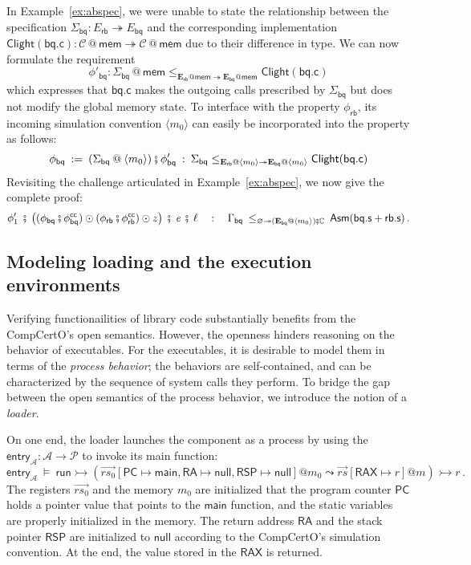 \documentclass[acmsmall,screen,review,anonymous,nonacm]{acmart}
\newcommand{\kw}[1]{\ensuremath{ \mathsf{#1} }}
\newcommand{\vcomp}{\fatsemi}
\begin{document}
In Example~\ref{ex:abspec},
we were unable to state the relationship
between the specification
$\Sigma_\kw{bq} : E_\kw{rb} \twoheadrightarrow E_\kw{bq}$
and the corresponding implementation
$\kw{Clight}(\kw{bq.c}) : \mathcal{C} \mathbin@ \kw{mem}
 \twoheadrightarrow \mathcal{C} \mathbin@ \kw{mem}$
due to their difference in type.
We can now formulate the requirement
\[
\phi'_\kw{bq} : \Sigma_\kw{bq} \mathbin@ \kw{mem}
\le_{\mathbf{E}_\kw{rb}@\kw{mem} \twoheadrightarrow \mathbf{E}_\kw{bq}@\kw{mem}}
\kw{Clight}(\kw{bq.c})
\]%
which expresses that $\kw{bq.c}$
makes the outgoing calls prescribed by $\Sigma_\kw{bq}$
but does not modify the global memory state.
To interface with
the property $\phi_\kw{rb}$,
its incoming simulation convention
$\langle m_0 \rangle$
can easily be incorporated into the property
as follows:
\[
  \phi_\kw{bq} \: := \:
    (\Sigma_\kw{bq} \mathbin@ \langle m_0 \rangle)
    \vcomp
    \phi'_\kw{bq}
  \: : \:
  \Sigma_\kw{bq}
    \le_{\mathbf{E}_\kw{rb} \mathbin@ \langle m_0 \rangle
         \twoheadrightarrow
         \mathbf{E}_\kw{bq} \mathbin@ \langle m_0 \rangle}
    \kw{Clight}(\kw{bq.c})
\]
Revisiting the challenge articulated in Example~\ref{ex:abspec},
we now give the complete proof:
\[
  \phi'_1
  \:\vcomp\:
  \big(
  (\phi_\kw{bq} \vcomp \phi^\kw{cc}_\kw{bq}) \odot
  (\phi_\kw{rb} \vcomp \phi^\kw{cc}_\kw{rb}) \odot z
  \big)
  \:\vcomp\:
  \textit{e}
  \:\vcomp\:
  \ell
  \quad : \quad
  \Gamma_\kw{bq}
  \:
  \le_{\varnothing \twoheadrightarrow
       (\mathbf{E}_\kw{bq} \mathbin@ \langle m_0 \rangle) \vcomp \mathbb{C}}
  \:
  \kw{Asm}(\kw{bq.s} + \kw{rb.s})
  \,.
\]

\subsection{Modeling loading and the execution environments}
\label{sec:application:loader}  %

Verifying functionailities
of library code substantially benefits from
the CompCertO's open semantics.
However,
the openness hinders reasoning
on the behavior of executables.
For the executables,
it is desirable to
model them
in terms of the \textit{process behavior};
the behaviors are self-contained,
and can be characterized
by the sequence of system calls
they perform.
To bridge the gap
between the open semantics of
the process behavior,
we introduce the notion of a \textit{loader}.

On one end,
the loader launches
the component as a process
by using the
$\kw{entry}_\mathcal{A} : \mathcal{A} \rightarrow \mathcal{P}$
to invoke its main function:
\[
  \kw{entry}_\mathcal{A} \:\vDash\:
  \kw{run} \rightarrowtail
  (\vec{rs_0}[\kw{PC}\mapsto \kw{main},
  \kw{RA} \mapsto \kw{null},
  \kw{RSP}\mapsto \kw{null}]@m_0 \leadsto
  \vec{rs}[\kw{RAX} \mapsto r]@m) \rightarrowtail r \,.
\]
The registers $\vec{rs_0}$ and the memory $m_0$ are
initialized that
the program counter $\kw{PC}$ holds a pointer value
that points to
the $\kw{main}$ function,
and the static variables
are properly initialized in the memory.
The return address $\kw{RA}$
and the stack pointer $\kw{RSP}$
are initialized to $\kw{null}$
according to the CompCertO's simulation convention.
At the end,
the value stored in the $\kw{RAX}$ is returned.
\end{document}
